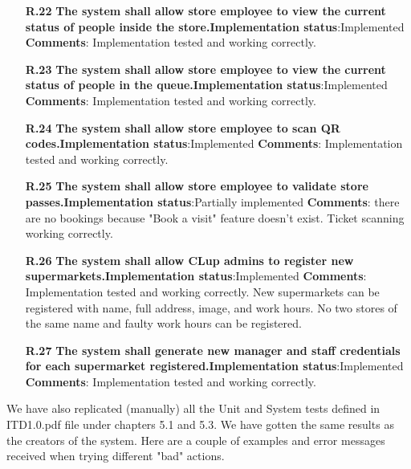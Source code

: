 \begin{itemize}
\item[\textbf{R.22}]\textbf{The system shall allow store employee to view the current status of people inside the store.}\newline \textbf{Implementation status}:Implemented \newline \textbf{Comments}: Implementation tested and working correctly.
\item[\textbf{R.23}]\textbf{The system shall allow store employee to view the current status of people in the queue.}\newline \textbf{Implementation status}:Implemented \newline \textbf{Comments}: Implementation tested and working correctly.
\item[\textbf{R.24}]\textbf{The system shall allow store employee to scan QR codes.}\newline \textbf{Implementation status}:Implemented \newline \textbf{Comments}: Implementation tested and working correctly.
\item[\textbf{R.25}]\textbf{The system shall allow store employee to validate store passes.}\newline \textbf{Implementation status}:Partially implemented \newline \textbf{Comments}: there are no bookings because "Book a visit" feature doesn't exist. Ticket scanning working correctly.
\item[\textbf{R.26}]\textbf{The system shall allow CLup admins to register new supermarkets.}\newline \textbf{Implementation status}:Implemented \newline \textbf{Comments}: Implementation tested and working correctly. New supermarkets can be registered with name, full address, image, and work hours. No two stores of the same name and faulty work hours can be registered.
\item[\textbf{R.27}]\textbf{The system shall generate new manager and staff credentials for each supermarket registered.}\newline \textbf{Implementation status}:Implemented \newline \textbf{Comments}: Implementation tested and working correctly.
\end{itemize}

We have also replicated (manually) all the Unit and System tests defined in ITD1.0.pdf file under chapters 5.1 and 5.3. We have gotten the same results as the creators of the system. Here are a couple of examples and error messages received when trying different "bad" actions.

